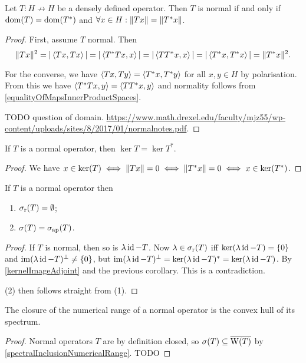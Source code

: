 \begin{proposition} \label{normalCriterion}
Let $T: H\not\to H$ be a densely defined operator. Then $T$ is normal \textup{if and only if} $\operatorname{dom}(T) = \operatorname{dom}(T^*)$ and $\forall x\in H: \lVert Tx\rVert = \lVert T^*x\rVert$.
\end{proposition}
\begin{proof}
First, assume $T$ normal. Then
\[ \lVert Tx\rVert^2 = |\left\langle Tx,Tx \right\rangle| = |\left\langle T^*Tx,x \right\rangle| = |\left\langle TT^*x,x \right\rangle| = |\left\langle T^*x,T^*x \right\rangle| = \lVert T^*x\rVert^2. \]

For the converse, we have $\left\langle Tx, Ty \right\rangle = \left\langle T^*x, T^* y \right\rangle$ for all $x,y\in H$ by polarisation. From this we have $\left\langle T^*Tx, y \right\rangle = \left\langle TT^*x, y \right\rangle$ and normality follows from \ref{equalityOfMapsInnerProductSpaces}.

TODO question of domain.
\url{https://www.math.drexel.edu/faculty/mjz55/wp-content/uploads/sites/8/2017/01/normalnotes.pdf}.
\end{proof}
\begin{corollary} \label{equalityKernelAdjointNormal}
If $T$ is a normal operator, then $\ker T = \ker T^*$.
\end{corollary}
\begin{proof}
We have $x\in\ker(T) \iff \lVert Tx\rVert = 0 \iff \lVert T^*x\rVert = 0 \iff x\in\ker(T^*)$. 
\end{proof}
\begin{corollary}
If $T$ is a normal operator then
\begin{enumerate}
\item $\sigma_\text{r}(T) = \emptyset$;
\item $\sigma(T) = \sigma_\text{ap}(T)$.
\end{enumerate} 
\end{corollary}
\begin{proof}
If $T$ is normal, then so is $\lambda\operatorname{id}-T$. Now $\lambda\in\sigma_\text{r}(T)$ iff $\ker(\lambda\operatorname{id} - T) = \{0\}$ and $\operatorname{im}(\lambda\operatorname{id}-T)^\perp \neq \{0\}$, but $\operatorname{im}(\lambda\operatorname{id}-T)^\perp = \ker(\lambda\operatorname{id}-T)^* = \ker(\lambda\operatorname{id}-T)$. By \ref{kernelImageAdjoint} and the previous corollary. This is a contradiction.

(2) then follows straight from (1).
\end{proof}

\begin{theorem} \label{closureNumericRangeConvexHullSpectrum}
The closure of the numerical range of a normal operator is the
convex hull of its spectrum.
\end{theorem}
\begin{proof}
Normal operators $T$ are by definition closed, so $\sigma(T)\subseteq \overline{\operatorname{W}(T)}$ by \ref{spectralInclusionNumericalRange}. TODO
\end{proof}


